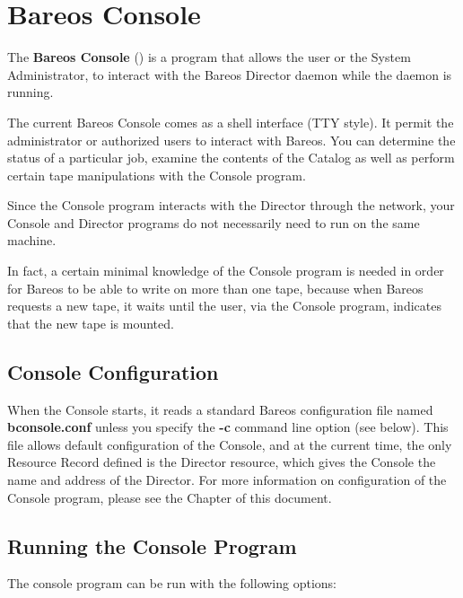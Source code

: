 
\chapter{Bareos Console}
\label{_ConsoleChapter}


The {\bf Bareos Console} () is a program that
allows the user or the System Administrator, to interact with the Bareos
Director daemon while the daemon is running.

The current Bareos Console comes as a shell interface (TTY
style). It permit the administrator or
authorized users to interact with Bareos. You can determine the status of a
particular job, examine the contents of the Catalog as well as perform certain
tape manipulations with the Console program.

Since the Console program interacts with the Director through the network, your
Console and Director programs do not necessarily need to run on the same
machine.

In fact, a certain minimal knowledge of the Console program is needed in order
for Bareos to be able to write on more than one tape, because when Bareos
requests a new tape, it waits until the user, via the Console program,
indicates that the new tape is mounted.

\section{Console Configuration}

When the Console starts, it reads a standard Bareos configuration file
named {\bf bconsole.conf} unless you specify the {\bf {-}c}
command line option (see below). This file allows default configuration
of the Console, and at the current time, the only Resource Record defined
is the Director resource, which gives the Console the name and address of
the Director.  For more information on configuration of the Console
program, please see the  Chapter of this document.

\section{Running the Console Program}

The console program can be run with the following options:

